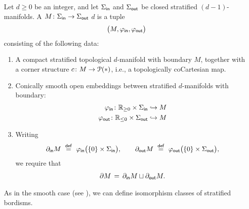 \begin{definition}
Let $d\geq 0$ be an integer, and let $\Sigma_{\sf in}$ and $\Sigma_{\sf out}$ be closed stratified $(d-1)$-manifolds. A  $M\colon \Sigma_{\sf in} \rightarrow \Sigma_{\sf out}$  $d$ is a tuple 
\begin{equation}
    \big(M,\varphi_{\sf in},\varphi_{\sf out}\big)
\end{equation}
consisting of the following data:
\begin{enumerate}
    \item A compact stratified topological $d$-manifold with boundary $M$, together with a corner structure $c \colon M \rightarrow \mathcal P(*)$, i.e., a topologically coCartesian map.
    \item Conically smooth open embeddings between stratified $d$-manifolds with boundary:
    \begin{align}
    \varphi_{\sf in} \colon \mathbb R_{\geq 0} \times \Sigma_{\sf in} & \hookrightarrow M \\
    \varphi_{\sf out} \colon \mathbb R_{\leq 0} \times \Sigma_{\sf out} & \hookrightarrow M 
    \end{align} 
    \item Writing
    \begin{equation}
        \partial_{\sf in}M \,\, \overset{\sf def}{=} \,\, \varphi_{\sf in}\big(\{0\}\times \Sigma_{\sf in}\big), \qquad \partial_{\sf out}M \,\, \overset{\sf def}{=} \,\, \varphi_{\sf out}\big(\{0\}\times \Sigma_{\sf out}\big),
    \end{equation}
    we require that
    \begin{equation}
        \partial M \,=\, \partial_{\sf in}M \sqcup \partial_{\sf out}M.
    \end{equation}
\end{enumerate}    
\end{definition}

As in the smooth case (see ), we can define isomorphism classes of stratified bordisms.

